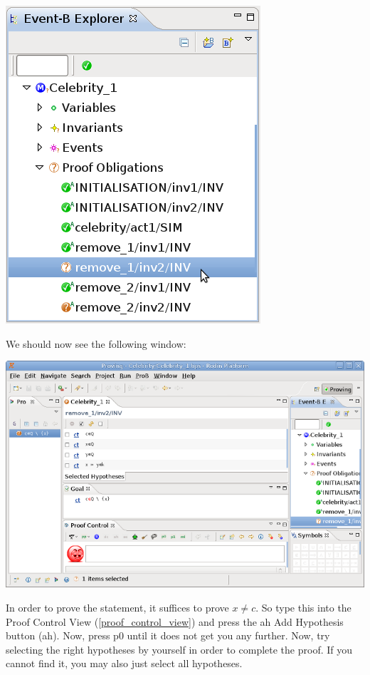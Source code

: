\begin{center}
	\includegraphics{img/tutorial/tut_08_proof1.png}
\end{center}

We should now see the following window:

\begin{center}
	\includegraphics{img/tutorial/tut_08_proof2.png}
\end{center}

In order to prove the statement, it suffices to prove \textsf{$x \neq c$}. So type this into the \textsf{Proof Control View} (\ref{proof_control_view}) and press the ah \textsf{Add Hypothesis button (ah)}. Now, press \textsf{p0} until it does not get you any further. Now, try selecting the right hypotheses by yourself in order to complete the proof. If you cannot find it, you may also just select all hypotheses.

